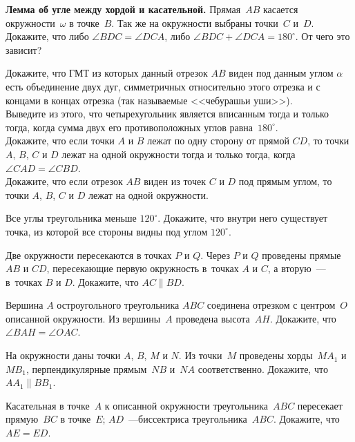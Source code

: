 \begin{problems}

\item\textbf{Лемма об угле между хордой и касательной.}
Прямая~$AB$ касается окружности~$\omega$ в точке~$B$.
Так же на окружности выбраны точки~$C$ и~$D$.
Докажите, что либо $\angle BDC = \angle DCA$, либо
$\angle BDC + \angle DCA = 180^\circ$.
От чего это зависит?


\item
\sbp
Докажите, что ГМТ из которых данный отрезок $AB$ виден под данным углом
$\alpha$ есть объединение двух дуг, симметричных относительно этого отрезка и с
концами в концах отрезка (так называемые <<чебурашьи уши>>).
\\
\sbp
Выведите из этого, что четырехугольник является вписанным тогда и только тогда,
когда сумма двух его противоположных углов равна~$180^\circ$.
\\
\sbp
Докажите, что если точки $A$ и $B$ лежат по одну сторону от прямой $CD$, то
точки $A$, $B$, $C$ и $D$ лежат на одной окружности тогда и только тогда, когда
$\angle CAD = \angle CBD$.
\\
\sbp
Докажите, что если отрезок $AB$ виден из точек $C$ и $D$ под прямым углом, то
точки $A$, $B$, $C$ и $D$ лежат на одной окружности.

\item
Все углы треугольника меньше $120^\circ$.
Докажите, что внутри него существует точка, из которой все стороны видны под
углом $120^\circ$.

\item
Две окружности пересекаются в точках $P$ и $Q$.
Через $P$ и $Q$ проведены прямые $AB$ и $CD$, пересекающие первую окружность
в~точках $A$ и $C$, а вторую~--- в~точках $B$ и $D$.
Докажите, что $AC \parallel BD$.

\item
Вершина $A$ остроугольного треугольника $ABC$ соединена отрезком с центром~$O$
описанной окружности.
Из вершины~$A$ проведена высота~$AH$.
Докажите, что~$\angle BAH = \angle OAC$.

\item
На окружности даны точки $A$, $B$, $M$ и $N$.
Из точки~$M$ проведены хорды~$M A_1$ и~$M B_1$, перпендикулярные прямым~$NB$
и~$NA$ соответственно.
Докажите, что $A A_1 \parallel B B_1$.

\item
Касательная в точке~$A$ к описанной окружности треугольника~$ABC$ пересекает
прямую~$BC$ в точке~$E$; $AD$~---биссектриса треугольника~$ABC$.
Докажите, что~$AE = ED$.

\end{problems}

